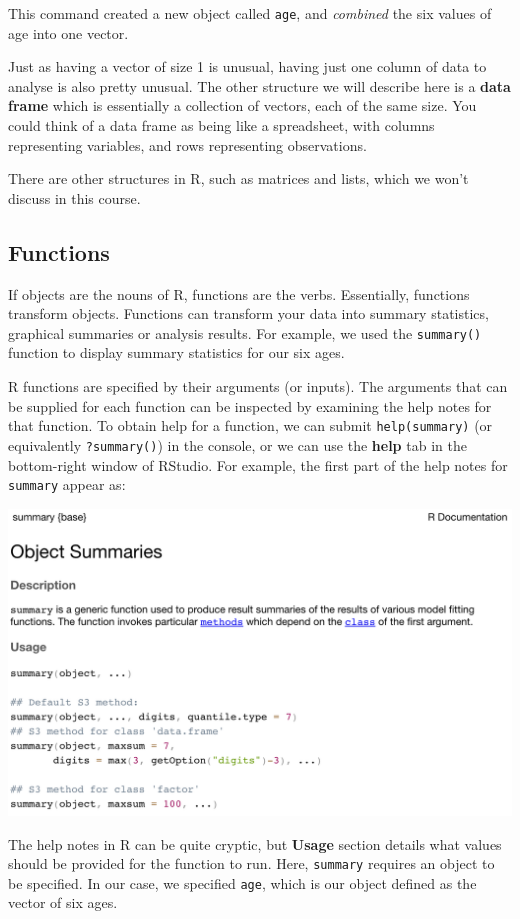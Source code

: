 \documentclass[
]{memoir}
\begin{document}
This command created a new object called \texttt{age}, and \emph{combined} the six values of age into one vector.

Just as having a vector of size 1 is unusual, having just one column of data to analyse is also pretty unusual. The other structure we will describe here is a \textbf{data frame} which is essentially a collection of vectors, each of the same size. You could think of a data frame as being like a spreadsheet, with columns representing variables, and rows representing observations.

There are other structures in R, such as matrices and lists, which we won't discuss in this course.

\hypertarget{functions}{%
\subsection{Functions}\label{functions}}

If objects are the nouns of R, functions are the verbs. Essentially, functions transform objects. Functions can transform your data into summary statistics, graphical summaries or analysis results. For example, we used the \texttt{summary()} function to display summary statistics for our six ages.

R functions are specified by their arguments (or inputs). The arguments that can be supplied for each function can be inspected by examining the help notes for that function. To obtain help for a function, we can submit \texttt{help(summary)} (or equivalently \texttt{?summary()}) in the console, or we can use the \textbf{help} tab in the bottom-right window of RStudio. For example, the first part of the help notes for \texttt{summary} appear as:

\includegraphics[width=0.8\linewidth]{img/help-1}

The help notes in R can be quite cryptic, but \textbf{Usage} section details what values should be provided for the function to run. Here, \texttt{summary} requires an object to be specified. In our case, we specified \texttt{age}, which is our object defined as the vector of six ages.
\end{document}
